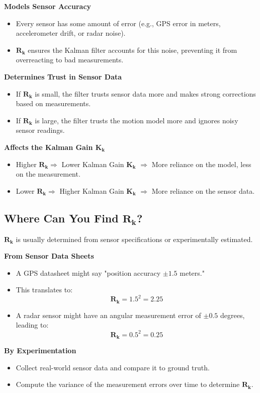 \documentclass{article}
\begin{document}
\textbf{Models Sensor Accuracy}
\begin{itemize}
    \item Every sensor has some amount of error (e.g., GPS error in meters, accelerometer drift, or radar noise).
    \item \(\mathbf{R_k}\) ensures the Kalman filter accounts for this noise, preventing it from overreacting to bad measurements.
\end{itemize}

\textbf{Determines Trust in Sensor Data}
\begin{itemize}
    \item If \(\mathbf{R_k}\) is small, the filter trusts sensor data more and makes strong corrections based on measurements.
    \item If \(\mathbf{R_k}\) is large, the filter trusts the motion model more and ignores noisy sensor readings.
\end{itemize}

\textbf{Affects the Kalman Gain \(\mathbf{K_k}\)}
\begin{itemize}
    \item Higher \(\mathbf{R_k} \Rightarrow\) Lower Kalman Gain \(\mathbf{K_k}\) \(\Rightarrow\) More reliance on the model, less on the measurement.
    \item Lower \(\mathbf{R_k} \Rightarrow\) Higher Kalman Gain \(\mathbf{K_k}\) \(\Rightarrow\) More reliance on the sensor data.
\end{itemize}

\subsection*{Where Can You Find \(\mathbf{R_k}\)?}
\(\mathbf{R_k}\) is usually determined from sensor specifications or experimentally estimated.

\textbf{From Sensor Data Sheets}
\begin{itemize}
    \item A GPS datasheet might say "position accuracy \(\pm 1.5\) meters."
    \item This translates to: 
    \[
    \mathbf{R_k} = 1.5^2 = 2.25
    \]
    \item A radar sensor might have an angular measurement error of \(\pm 0.5\) degrees, leading to:
    \[
    \mathbf{R_k} = 0.5^2 = 0.25
    \]
\end{itemize}

\textbf{By Experimentation}
\begin{itemize}
    \item Collect real-world sensor data and compare it to ground truth.
    \item Compute the variance of the measurement errors over time to determine \(\mathbf{R_k}\).
\end{itemize}
\end{document}
